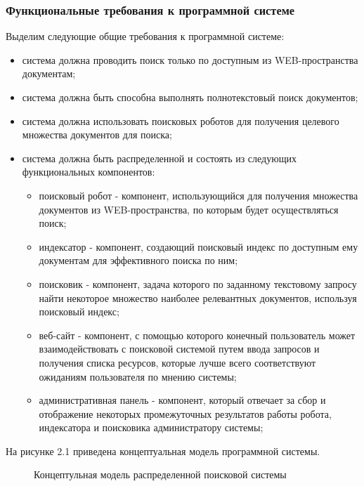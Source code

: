 \subsubsection{Функциональные требования к программной системе}

Выделим следующие общие требования к программной системе:
\begin{itemize}
\item система должна проводить поиск только по доступным из WEB-пространства документам;
\item система должна быть способна выполнять полнотекстовый поиск документов;
\item система должна использовать поисковых роботов для получения целевого множества документов для поиска;
\item система должна быть распределенной и состоять из следующих функциональных компонентов:
\begin{itemize}
\item поисковый робот - компонент, использующийся для получения множества документов из WEB-пространства, по которым будет осуществляться поиск;
\item индексатор - компонент, создающий поисковый индекс по доступным ему документам для эффективного поиска по ним;
\item поисковик - компонент, задача которого по заданному текстовому запросу найти некоторое множество наиболее релевантных документов, используя поисковый индекс;
\item веб-сайт - компонент, с помощью которого конечный пользователь может взаимодействовать с поисковой системой путем ввода запросов и получения списка ресурсов, которые лучше всего соответствуют ожиданиям пользователя по мнению системы;
\item административная панель - компонент, который отвечает за сбор и отображение некоторых промежуточных результатов работы робота, индексатора и поисковика администратору системы;
\end{itemize}
\end{itemize}

На рисунке 2.1 приведена концептуальная модель программной системы.

\begin{figure}
\caption{Концептульная модель распределенной поисковой системы}
\label{concept_system_model:image}
\end{figure}

